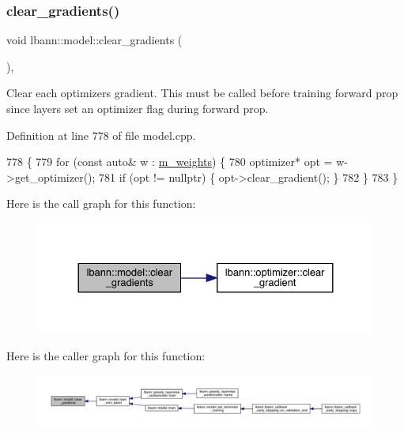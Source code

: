 \subsubsection{\texorpdfstring{clear\+\_\+gradients()}{clear\_gradients()}}
{\footnotesize\ttfamily void lbann\+::model\+::clear\+\_\+gradients (\begin{DoxyParamCaption}{ }\end{DoxyParamCaption})\hspace{0.3cm}{\ttfamily [protected]}, {\ttfamily [virtual]}}

Clear each optimizer\textquotesingle{}s gradient. This must be called before training forward prop since layers set an optimizer flag during forward prop. 

Definition at line 778 of file model.\+cpp.


\begin{DoxyCode}
778                             \{
779   \textcolor{keywordflow}{for} (\textcolor{keyword}{const} \textcolor{keyword}{auto}& w : \hyperlink{classlbann_1_1model_aaf9adefe4497d90bf5bc2567e71bfb00}{m\_weights}) \{
780     optimizer* opt = w->get\_optimizer();
781     \textcolor{keywordflow}{if} (opt != \textcolor{keyword}{nullptr}) \{ opt->clear\_gradient(); \}
782   \}
783 \}
\end{DoxyCode}
Here is the call graph for this function\+:\nopagebreak
\begin{figure}[H]
\begin{center}
\leavevmode
\includegraphics[width=330pt]{classlbann_1_1model_ae4ca41f514498a37503ecc6ba1600bab_cgraph}
\end{center}
\end{figure}
Here is the caller graph for this function\+:\nopagebreak
\begin{figure}[H]
\begin{center}
\leavevmode
\includegraphics[width=350pt]{classlbann_1_1model_ae4ca41f514498a37503ecc6ba1600bab_icgraph}
\end{center}
\end{figure}
\mbox{\label{classlbann_1_1model_aa819e0d7c8bb178155e40e33037cf054}} 
